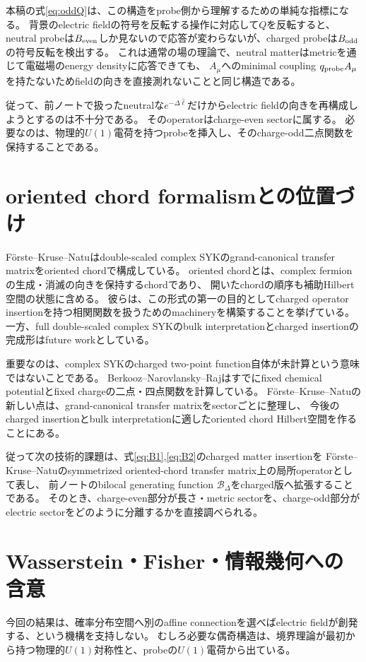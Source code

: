 \documentclass[a4paper,11pt]{ltjsarticle}
\numberwithin{equation}{section}
\begin{document}
本稿の式\eqref{eq:oddQ}は、この構造をprobe側から理解するための単純な指標になる。
背景のelectric fieldの符号を反転する操作に対応して$Q$を反転すると、
neutral probeは$B_{\rm even}$しか見ないので応答が変わらないが、charged probeは$B_{\rm odd}$の符号反転を検出する。
これは通常の場の理論で、neutral matterはmetricを通じて電磁場のenergy densityに応答できても、
$A_\mu$へのminimal coupling $q_{\rm probe}A_\mu$を持たないためfieldの向きを直接測れないことと同じ構造である。

従って、前ノートで扱ったneutralな$e^{-\Delta\hat\ell}$だけからelectric fieldの向きを再構成しようとするのは不十分である。
そのoperatorはcharge-even sectorに属する。
必要なのは、物理的$U(1)$電荷を持つprobeを挿入し、そのcharge-odd二点関数を保持することである。

\section{oriented chord formalismとの位置づけ}
F\"orste--Kruse--Natuはdouble-scaled complex SYKのgrand-canonical transfer matrixをoriented chordで構成している\cite{FKN}。
oriented chordとは、complex fermionの生成・消滅の向きを保持するchordであり、
開いたchordの順序も補助Hilbert空間の状態に含める。
彼らは、この形式の第一の目的としてcharged operator insertionを持つ相関関数を扱うためのmachineryを構築することを挙げている。
一方、full double-scaled complex SYKのbulk interpretationとcharged insertionの完成形はfuture workとしている\cite{FKN}。

重要なのは、complex SYKのcharged two-point function自体が未計算という意味ではないことである。
Berkooz--Narovlansky--Rajはすでにfixed chemical potentialとfixed chargeの二点・四点関数を計算している\cite{BNR}。
F\"orste--Kruse--Natuの新しい点は、grand-canonical transfer matrixをsectorごとに整理し、
今後のcharged insertionとbulk interpretationに適したoriented chord Hilbert空間を作ることにある。

従って次の技術的課題は、式\eqref{eq:B1},\eqref{eq:B2}のcharged matter insertionを
F\"orste--Kruse--Natuのsymmetrized oriented-chord transfer matrix上の局所operatorとして表し、
前ノートのbilocal generating function $\mathcal B_\Delta$をcharged版へ拡張することである。
そのとき、charge-even部分が長さ・metric sectorを、charge-odd部分がelectric sectorをどのように分離するかを直接調べられる。

\section{Wasserstein・Fisher・情報幾何への含意}
今回の結果は、確率分布空間へ別のaffine connectionを選べばelectric fieldが創発する、という機構を支持しない。
むしろ必要な偶奇構造は、境界理論が最初から持つ物理的$U(1)$対称性と、probeの$U(1)$電荷から出ている。
\end{document}

